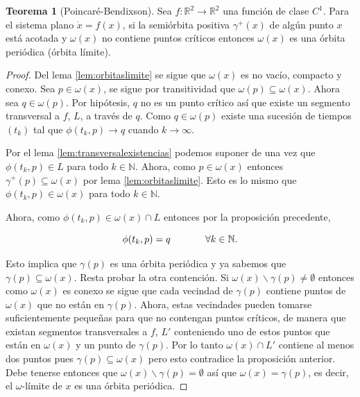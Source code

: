 \documentclass[11pt]{book}
\theoremstyle{definition}
\numberwithin{definition}{section}
\theoremstyle{theorem}
\newtheorem{theorem}{Teorema}
\numberwithin{theorem}{section}
\numberwithin{lemma}{section}
\numberwithin{corollary}{section}
\theoremstyle{plain}
\numberwithin{example}{section}
\newcommand{\N}{{\ensuremath{\mathbb{N}}}}
\newcommand{\R}{{\ensuremath{\mathbb{R}}}}
\begin{document}
\begin{theorem}[Poincaré-Bendixson] \label{teo:poincarebendixson} Sea $f:\R^2 \to \R^2$ una función de clase $C^1$. Para el sistema plano $\dot{x} = f(x)$, si la semiórbita positiva $\gamma^+(x)$ de algún punto $x$ está acotada y $\omega(x)$ no contiene puntos críticos entonces $\omega(x)$ es una órbita periódica (órbita límite).
\end{theorem}

\begin{proof}
Del lema \ref{lem:orbitaslimite} se sigue que $\omega(x)$ es no vacío, compacto y conexo. Sea $p \in \omega(x)$, se sigue por transitividad que $\omega(p) \subseteq \omega(x)$. Ahora sea $q \in \omega(p)$. Por hipótesis, $q$ no es un punto crítico así que existe un segmento transversal a $f$, $L$, a través de $q$.  Como $q \in \omega(p)$ existe una sucesión de tiempos $(t_k)$ tal que $\phi(t_k, p) \to q$ cuando $k \to \infty$.

Por el lema \ref{lem:transversalexistencias} podemos suponer de una vez que $\phi(t_k, p) \in L$ para todo $k \in \N$. Ahora, como $p \in \omega(x)$ entonces $\gamma^+(p) \subseteq \omega(x)$ por lema \ref{lem:orbitaslimite}. Esto es lo mismo que $\phi(t_k, p) \in \omega(x)$ para todo $k \in \N$.

Ahora, como $\phi(t_k, p) \in \omega(x) \cap L$ entonces por la proposición precedente,

$$ \phi(t_k, p) = q  \hspace{0.5in} \forall k \in \N.$$

Esto implica que $\gamma(p)$ es una órbita periódica y ya sabemos que $\gamma(p) \subseteq \omega(x)$. Resta probar la otra contención.
Si $\omega(x) \backslash \gamma(p) \neq \emptyset$ entonces como $\omega(x)$ es conexo se sigue que cada vecindad de $\gamma(p)$ contiene puntos de $\omega(x)$ que no están en $\gamma(p)$.
Ahora, estas vecindades pueden tomarse suficientemente pequeñas para que no contengan puntos críticos, de manera que existan segmentos transversales a $f$, $L'$ conteniendo uno de estos puntos que están en $\omega(x)$ y un punto de $\gamma(p)$. Por lo tanto $\omega(x) \cap L'$ contiene al menos dos puntos pues $\gamma(p) \subseteq \omega(x)$ pero esto contradice la proposición anterior.
Debe tenerse entonces que $\omega(x) \backslash \gamma(p) = \emptyset$ así que $\omega(x) = \gamma(p)$, es decir, el $\omega$-límite de $x$ es una órbita periódica.

\end{proof}
\end{document}
